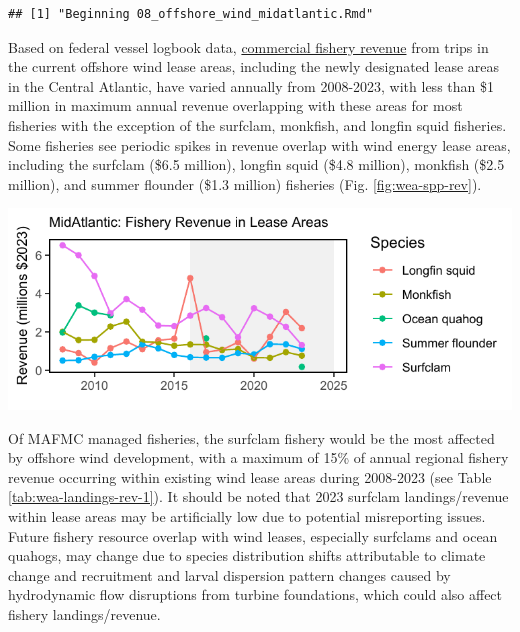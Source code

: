 \documentclass[
  10pt,
]{article}
\let\origfigure\figure
\let\endorigfigure\endfigure
\renewenvironment{figure}[1][2] {
    \expandafter\origfigure\expandafter[H]
} {
    \endorigfigure
}
\begin{document}
\begin{verbatim}
## [1] "Beginning 08_offshore_wind_midatlantic.Rmd"
\end{verbatim}

Based on federal vessel logbook data, \href{https://noaa-edab.github.io/catalog/wind_revenue.html}{commercial fishery revenue} from trips in the current offshore wind lease areas, including the newly designated lease areas in the Central Atlantic, have varied annually from 2008-2023, with less than \$1 million in maximum annual revenue overlapping with these areas for most fisheries with the exception of the surfclam, monkfish, and longfin squid fisheries. Some fisheries see periodic spikes in revenue overlap with wind energy lease areas, including the surfclam (\$6.5 million), longfin squid (\$4.8 million), monkfish (\$2.5 million), and summer flounder (\$1.3 million) fisheries (Fig. \ref{fig:wea-spp-rev}).

\begin{figure}

{\centering \includegraphics{midatlantic_files/figure-latex/wea-spp-rev-1} 

}

\caption{Fishery revenue in wind energy lease areas in the Mid-Atlantic.}\label{fig:wea-spp-rev}
\end{figure}

Of MAFMC managed fisheries, the surfclam fishery would be the most affected by offshore wind development, with a maximum of 15\% of annual regional fishery revenue occurring within existing wind lease areas during 2008-2023 (see Table \ref{tab:wea-landings-rev-1}). It should be noted that 2023 surfclam landings/revenue within lease areas may be artificially low due to potential misreporting issues. Future fishery resource overlap with wind leases, especially surfclams and ocean quahogs, may change due to species distribution shifts attributable to climate change and recruitment and larval dispersion pattern changes caused by hydrodynamic flow disruptions from turbine foundations, which could also affect fishery landings/revenue.
\end{document}
